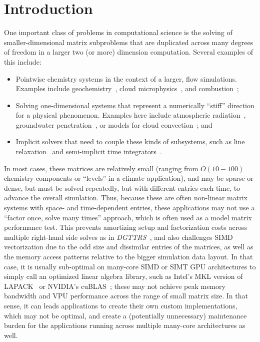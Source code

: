 \documentclass[conference]{IEEEtran}
\begin{document}
\section{Introduction}
\label{sec:intro}
% 
One important class of problems in computational science is the solving
  of smaller-dimensional matrix subproblems that are duplicated across
  many degrees of freedom in a larger two (or more) dimension computation.
Several examples of this include: 
\begin{itemize}
\item Pointwise chemistry systems in the context of a larger, 
  flow simulations. 
Examples include geochemistry~\cite{PFLOTRAN_2010}, 
  cloud microphysics~\cite{MG2_2015}, and combustion~\cite{PaznerEtAl_2016};
\item Solving one-dimensional systems that represent a numerically ``stiff''
  direction for a physical phenomenon.
Examples here include atmospheric radiation~\cite{RRTMG_2008}, groundwater
  penetration~\cite{CLM_PFLO_2016}, or models for 
  cloud convection~\cite{SAM_2005}; and
\item Implicit solvers that need to couple these kinds of subsystems, 
  such as line relaxation~\cite{TrottenbergEtAl_2000} and 
  semi-implicit time integrators~\cite{WellerEtAl_2013}.
\end{itemize}
In most cases, these matrices are relatively small 
  (ranging from $O(10-100)$ chemistry components or ``levels'' 
  in a climate application), and may be sparse or dense, but must 
  be solved repeatedly, but with different entries each time, 
  to advance the overall simulation.
Thus, because these are often non-linear matrix systems with space- and 
  time-dependent entries, these applications may not use a 
  ``factor once, solve many times'' approach, which is often used 
  as a model matrix performance test.
This prevents amortizing setup and factorization costs
  across multiple right-hand side solves as in 
  \emph{DGTTRS}~\cite{IntelMKL_DGTTRS},
  and also challenges SIMD vectorization due to the odd size and
  dissimilar entries of the matrices, as well as the 
  memory access patterns relative to the bigger simulation data layout.
In that case, it is usually sub-optimal on many-core SIMD 
  or SIMT GPU architectures
  to simply call an optimized linear algebra library, 
  such as Intel's MKL version of LAPACK~\cite{mkl_website} or NVIDIA's
  cuBLAS~\cite{cublas_website}; these may not achieve peak memory bandwidth 
  and VPU performance across the range of small matrix size. 
In that sense, it can leads applications to create their own 
  custom implementations, which may not be optimal, and create a 
  (potentially unnecessary) maintenance burden for the applications 
  running across multiple many-core architectures as well. 
  
\end{document}
